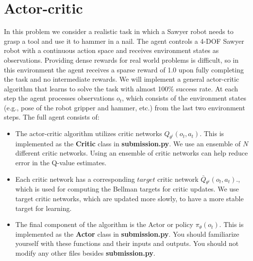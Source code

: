 \section{Actor-critic}


In this problem we consider a realistic task in which a Sawyer robot needs to grasp a tool and use it to hammer in a nail. 
The agent controls a 4-DOF Sawyer robot with a continuous action space and receives environment states as observations.  
Providing dense rewards for real world problems is difficult, so in this environment the agent receives a sparse reward of 1.0 upon fully completing the task and no intermediate rewards. 
We will implement a general actor-critic algorithm that learns to solve the task with almost 100\% success rate. 
At each step the agent processes observations $o_t$, which consists of the environment states (e.g., pose of the robot gripper and hammer, etc.) from the last two environment steps. 
The full agent consists of:

\begin{itemize}
  \item The actor-critic algorithm utilizes critic networks $Q_{\theta^i}(o_t, a_t)$. This is implemented as the \textbf{Critic} class in \textbf{submission.py}. We use an ensemble 
  of $N$ different critic networks. Using an ensemble of critic networks can help reduce error in the Q-value estimates.
  \item Each critic network has a corresponding $target$ critic network $\bar{Q}_{\theta^i}(o_t, a_t)$., which is used for computing the Bellman targets for critic updates. 
  We use target critic networks, which are updated more slowly, to have a more stable target for learning.
  \item The final component of the algorithm is the Actor or policy $\pi_{\theta}(o_{t})$. This is implemented as the \textbf{Actor} class in \textbf{submission.py}. 
  You should familiarize yourself with these functions and their inputs and outputs. You should not modify any other files besides \textbf{submission.py}.
\end{itemize}


\begin{enumerate}[(a)]

  

  

  

\end{enumerate}



